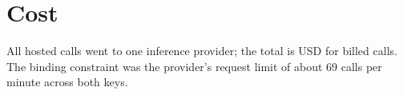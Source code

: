 \begin{table}[!htbp]
\centering\footnotesize
{}
\caption{Local model: probe quality, out-of-fold over task families, with shuffled-label and bag-of-words
controls. P1 separates the model's notes from other models' notes; P2 separates genuine from forged notes.}
\label{tab:localprobes}
\end{table}

\begin{table}[!htbp]
\centering\footnotesize
{}
\caption{Local model: separating its own notes from notes that two hosted models wrote for the same sessions.}
\label{tab:localself}
\end{table}

\section{Cost}
\label{app:cost}

All hosted calls went to one inference provider; the total is \CostTotal{} USD for \CostCallsTotal{} billed
calls. The binding constraint was the provider's request limit of about 69 calls per minute across both keys.

\begin{table}[!htbp]
\centering\small
{}
\caption{Calls, tokens and cost by stage and by model, from the spend ledger (USD, as reported in the
\texttt{usage.cost} field of each response). The total includes pilots and the calls set aside under
Amendment~2.}
\label{tab:cost}
\end{table}

